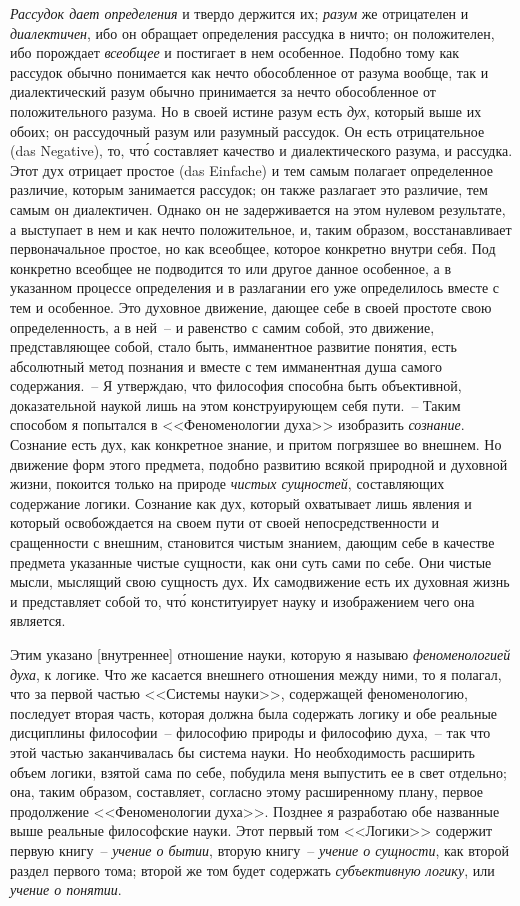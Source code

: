 \emph{Рассудок дает определения} и твердо держится их;
\emph{разум} же отрицателен и \emph{диалектичен}, ибо он обращает
определения рассудка в ничто; он положителен, ибо порождает
\emph{всеобщее} и постигает в нем особенное. Подобно
тому как рассудок обычно понимается как нечто обособленное
от разума вообще, так и диалектический разум
обычно принимается за нечто обособленное от положительного
разума. Но в своей истине разум есть \emph{дух}, который
выше их обоих; он рассудочный разум или разумный
рассудок. Он есть отрицательное (das Negative), то,
чт\'о составляет качество и диалектического разума, и рассудка.
Этот дух отрицает простое (das Einfache) и тем
самым полагает определенное различие, которым занимается
рассудок; он также разлагает это различие, тем
самым он диалектичен. Однако он не задерживается на
этом нулевом результате, а выступает в нем и как нечто
положительное, и, таким образом, восстанавливает первоначальное
простое, но как всеобщее, которое конкретно
внутри себя. Под конкретно всеобщее не подводится то
или другое данное особенное, а в указанном процессе
определения и в разлагании его уже определилось вместе
с тем и особенное. Это духовное движение, дающее
себе в своей простоте свою определенность, а в ней~-- и
равенство с самим собой, это движение, представляющее
собой, стало быть, имманентное развитие понятия, есть
абсолютный метод познания и вместе с тем имманентная
душа самого содержания.~-- Я утверждаю, что философия
способна быть объективной, доказательной наукой лишь
на этом конструирующем себя пути.~-- Таким способом
я попытался в <<Феноменологии духа>> изобразить \emph{сознание}.
Сознание есть дух, как конкретное знание, и притом
погрязшее во внешнем. Но движение форм этого
предмета, подобно развитию всякой природной и духовной
жизни, покоится только на природе \emph{чистых сущностей},
составляющих содержание логики. Сознание как
дух, который охватывает лишь явления и который освобождается
на своем пути от своей непосредственности и
сращенности с внешним, становится чистым знанием,
дающим себе в качестве предмета указанные чистые
сущности, как они суть сами по себе. Они чистые мысли,
мыслящий свою сущность дух. Их самодвижение есть
их духовная жизнь и представляет собой то, чт\'о конституирует
науку и изображением чего она является.

Этим указано [внутреннее] отношение науки, которую
я называю \emph{феноменологией духа}, к логике. Что же касается
внешнего отношения между ними, то я полагал,
что за первой частью <<Системы науки>>\footnotemark{}, содержащей
феноменологию, последует вторая часть, которая должна
была содержать логику и обе реальные дисциплины
философии~-- философию природы и философию духа,~--
так что этой частью заканчивалась бы система науки.
Но необходимость расширить объем логики, взятой сама
по себе, побудила меня выпустить ее в свет отдельно;
она, таким образом, составляет, согласно этому расширенному
плану, первое продолжение <<Феноменологии
духа>>. Позднее я разработаю обе названные выше реальные
философские науки. Этот первый том <<Логики>> содержит
первую книгу~-- \emph{учение о бытии}, вторую книгу~--
\emph{учение о сущности}, как второй раздел первого тома; второй
же том будет содержать \emph{субъективную логику}, или
\emph{учение о понятии}.

